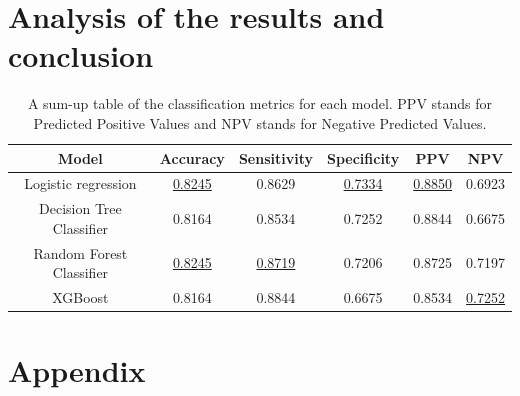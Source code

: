 \documentclass[a4paper,11pt, titlepage]{article}
\begin{document}
\section{Analysis of the results and conclusion} \label{results}
\begin{table}[h!]
    \begin{tabular}[t]{|c|ccccc|}
        \rowcolor{orange!30}
\hline
\textbf{Model} & \textbf{Accuracy} & \textbf{Sensitivity} & \textbf{Specificity} & \textbf{PPV} & \textbf{NPV} \\
\hline
Logistic regression         & \underline{0.8245} & 0.8629 & \underline{0.7334} & \underline{0.8850} & 0.6923 \\
Decision Tree Classifier    & 0.8164          & 0.8534 & 0.7252 & 0.8844 & 0.6675 \\
Random Forest Classifier    & \underline{0.8245} & \underline{0.8719} & 0.7206 & 0.8725 & 0.7197 \\
XGBoost                     & 0.8164          & 0.8844 & 0.6675 & 0.8534 & \underline{0.7252} \\
\hline
    \end{tabular}
\centering
\caption{A sum-up table of the classification metrics for each model. PPV stands for Predicted Positive Values and NPV stands for Negative Predicted Values.}
\label{metrics}
\end{table}%

\appendix


\section{Appendix}

\end{document}
